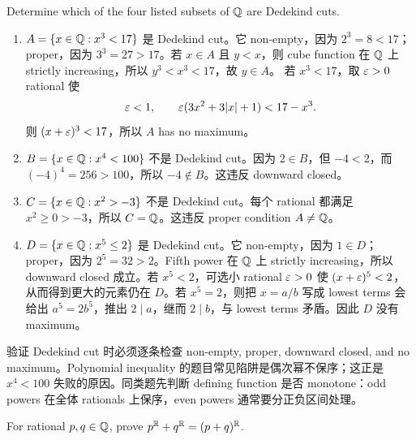 \begin{exerciseblock}
Determine which of the four listed subsets of \(\mathbb{Q}\) are Dedekind cuts.
\end{exerciseblock}

\begin{solution}
\begin{enumerate}[label=(\arabic*)]
  \item \(A=\{x\in\mathbb{Q}:x^3<17\}\) 是 Dedekind cut。它 non-empty，因为
  \(2^3=8<17\)；proper，因为 \(3^3=27>17\)。若 \(x\in A\) 且 \(y<x\)，则 cube
  function 在 \(\mathbb{Q}\) 上 strictly increasing，所以 \(y^3<x^3<17\)，故 \(y\in A\)。
  若 \(x^3<17\)，取 \(\varepsilon>0\) rational 使
  \[
    \varepsilon<1,\qquad \varepsilon(3x^2+3|x|+1)<17-x^3.
  \]
  则 \((x+\varepsilon)^3<17\)，所以 \(A\) has no maximum。

  \item \(B=\{x\in\mathbb{Q}:x^4<100\}\) 不是 Dedekind cut。因为 \(2\in B\)，但
  \(-4<2\)，而 \((-4)^4=256>100\)，所以 \(-4\notin B\)。这违反 downward closed。

  \item \(C=\{x\in\mathbb{Q}:x^2>-3\}\) 不是 Dedekind cut。每个 rational 都满足
  \(x^2\geq0>-3\)，所以 \(C=\mathbb{Q}\)。这违反 proper condition \(A\ne\mathbb{Q}\)。

  \item \(D=\{x\in\mathbb{Q}:x^5\leq2\}\) 是 Dedekind cut。它 non-empty，因为 \(1\in D\)；
  proper，因为 \(2^5=32>2\)。Fifth power 在 \(\mathbb{Q}\) 上 strictly increasing，所以
  downward closed 成立。若 \(x^5<2\)，可选小 rational \(\varepsilon>0\) 使
  \((x+\varepsilon)^5<2\)，从而得到更大的元素仍在 \(D\)。若 \(x^5=2\)，则把
  \(x=a/b\) 写成 lowest terms 会给出 \(a^5=2b^5\)，推出 \(2\mid a\)，继而
  \(2\mid b\)，与 lowest terms 矛盾。因此 \(D\) 没有 maximum。
\end{enumerate}
\end{solution}

\begin{explanation}
验证 Dedekind cut 时必须逐条检查 non-empty, proper, downward closed, and no
maximum。Polynomial inequality 的题目常见陷阱是偶次幂不保序；这正是
\(x^4<100\) 失败的原因。同类题先判断 defining function 是否 monotone：odd powers
在全体 rationals 上保序，even powers 通常要分正负区间处理。
\end{explanation}

\begin{exerciseblock}
For rational \(p,q\in\mathbb{Q}\), prove \(p^{\mathbb{R}}+q^{\mathbb{R}}=(p+q)^{\mathbb{R}}\).
\end{exerciseblock}

